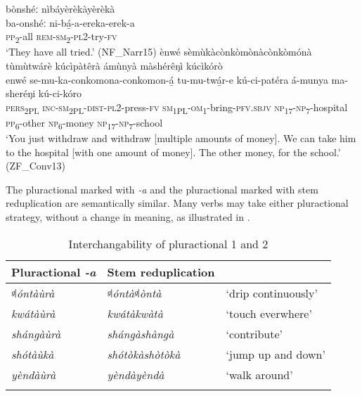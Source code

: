 \ea
\label{bkm:Ref75178156}
bònshéː nìbáyèrèkàyèrèkà\\
\gll ba-onshéː  ni-bá̲-a-ereka-erek-a\\
\textsc{pp}\textsubscript{2}-all    \textsc{rem}-\textsc{sm}\textsubscript{2}-\textsc{pl}2-try-\textsc{fv}\\
\glt ‘They have all tried.’ (NF\_Narr15)
\z
\pagebreak
\ea
\label{bkm:Ref75178157}
ènwé sèmùkàcònkòmònàcònkòmónà tùmùtwárè kúcìpàtêrà ámùnyà màshérêŋì kúcìkórò\\
\gll enwé  se-mu-ka-conkomona-conkomon-á̲  tu-mu-twá̲r-e kú-ci-patéra    á-munya  ma-sheréŋi  kú-ci-kóro\\
\textsc{pers}\textsubscript{2PL} \textsc{inc}-\textsc{sm}\textsubscript{2PL}-\textsc{dist}-\textsc{pl}2-press-\textsc{fv}     \textsc{sm}\textsubscript{1PL}-\textsc{om}\textsubscript{1}-bring-\textsc{pfv}.\textsc{sbjv} \textsc{np}\textsubscript{17}-\textsc{np}\textsubscript{7}-hospital  \textsc{pp}\textsubscript{6}-other  \textsc{np}\textsubscript{6}-money  \textsc{np}\textsubscript{17}-\textsc{np}\textsubscript{7}-school\\
\glt ‘You just withdraw and withdraw [multiple amounts of money]. We can take him to the hospital [with one amount of money]. The other money, for the school.’ (ZF\_Conv13)
\z

The pluractional marked with \textit{-a} and the pluractional marked with stem reduplication are semantically similar. Many verbs may take either pluractional strategy, without a change in meaning, as illustrated in .

\begin{table}
\label{bkm:Ref98833464}\caption{\label{tab:6:11}Interchangability of pluractional 1 and 2}
\begin{tabular}{lll}
\lsptoprule
Pluractional \textit{-a} & Stem reduplication & \\
\midrule
{\itshape ᵍǀóntàùrà} & {\itshape \-ᵍǀóntàᵍǀòntà} & ‘drip continuously’\\
\textit{kwátàùrà} & {\itshape kwátàkwàtà} & ‘touch everwhere’\\
\textit{shángàùrà} & {\itshape shángàshàngà} & ‘contribute’\\
\textit{shótàùkà} & {\itshape shótòkàshòtòkà} & ‘jump up and down’\\
\textit{yèndàùrà} & {\itshape yèndàyèndà} & ‘walk around’\\
\lspbottomrule
\end{tabular}
\end{table}

